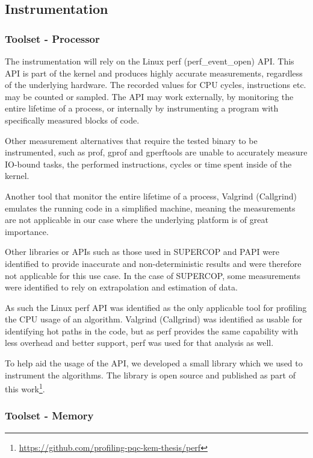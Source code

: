 \subsection{Instrumentation}

\subsubsection{Toolset - Processor}
The instrumentation will rely on the Linux perf (perf\_event\_open) API. This API is part of the kernel and produces highly accurate measurements, regardless of the underlying hardware. The recorded values for CPU cycles, instructions etc. may be counted or sampled. The API may work externally, by monitoring the entire lifetime of a process, or internally by instrumenting a program with specifically measured blocks of code.

Other measurement alternatives that require the tested binary to be instrumented, such as prof, gprof and gperftools are unable to accurately measure IO-bound tasks, the performed instructions, cycles or time spent inside of the kernel.

Another tool that monitor the entire lifetime of a process, Valgrind (Callgrind) emulates the running code in a simplified machine, meaning the measurements are not applicable in our case where the underlying platform is of great importance.

Other libraries or APIs such as those used in SUPERCOP and PAPI were identified to provide inaccurate and non-deterministic results and were therefore not applicable for this use case. In the case of SUPERCOP, some measurements were identified to rely on extrapolation and estimation of data.

As such the Linux perf API was identified as the only applicable tool for profiling the CPU usage of an algorithm. Valgrind (Callgrind) was identified as usable for identifying hot paths in the code, but as perf provides the same capability with less overhead and better support, perf was used for that analysis as well.

To help aid the usage of the API, we developed a small library which we used to instrument the algorithms. The library is open source and published as part of this work\footnote{\href{https://github.com/profiling-pqc-kem-thesis/perf}{https://github.com/profiling-pqc-kem-thesis/perf}}.

\subsubsection{Toolset - Memory}

